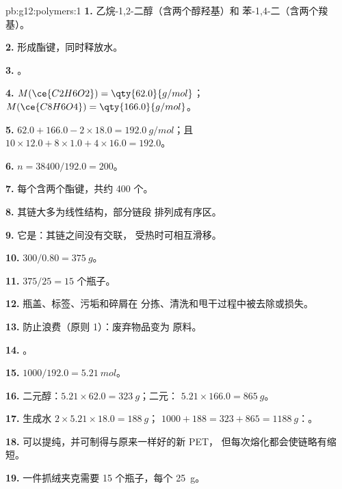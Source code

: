 \begin{solution}{pb:g12:polymers:1}
\textbf{1.} 乙烷-1,2-二醇（含两个醇羟基）和
苯-1,4-二（含两个羧基）。

\textbf{2.} 形成酯键，同时释放水。

\textbf{3.} 。

\textbf{4.} $M(\ce{C2H6O2}) = \qty{62.0}{g/mol}$；$M(\ce{C8H6O4}) =
\qty{166.0}{g/mol}$。

\textbf{5.} $62.0 + 166.0 - 2 \times 18.0 = \qty{192.0}{g/mol}$；且
$10 \times 12.0 + 8 \times 1.0 + 4 \times 16.0 = 192.0$。

\textbf{6.} $n = 38400/192.0 = 200$。

\textbf{7.} 每个含两个酯键，共约 400 个。

\textbf{8.} 其链大多为线性结构，部分链段
排列成有序区。

\textbf{9.} 它是：其链之间没有交联，
受热时可相互滑移。

\textbf{10.} $300/0.80 = \qty{375}{g}$。

\textbf{11.} $375/25 = 15$ 个瓶子。

\textbf{12.} 瓶盖、标签、污垢和碎屑在
分拣、清洗和甩干过程中被去除或损失。

\textbf{13.} 防止浪费（原则 1）：废弃物品变为
原料。

\textbf{14.} 。

\textbf{15.} $1000/192.0 = \qty{5.21}{mol}$。

\textbf{16.} 二元醇：$5.21 \times 62.0 = \qty{323}{g}$；二元：
$5.21 \times 166.0 = \qty{865}{g}$。

\textbf{17.} 生成水 $2 \times 5.21 \times 18.0 = \qty{188}{g}$；
$1000 + 188 = 323 + 865 = \qty{1188}{g}$：。

\textbf{18.} 可以提纯，并可制得与原来一样好的新 PET，
但每次熔化都会使链略有缩短。

\textbf{19.} 一件抓绒夹克需要 15 个瓶子，每个 \qty{25}{g}。
\end{solution}
